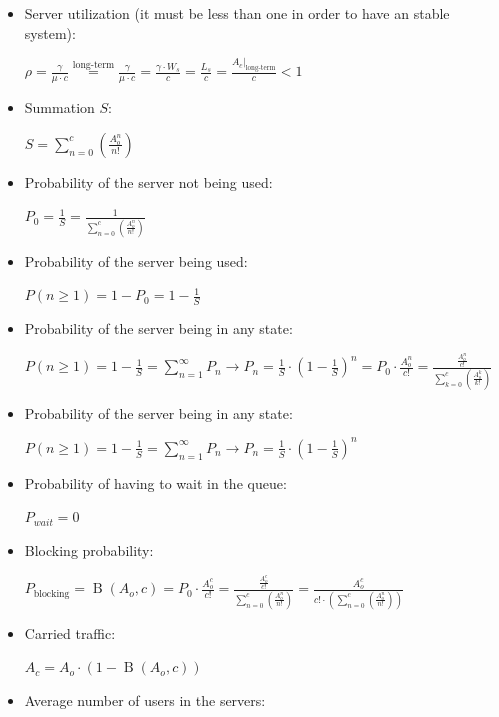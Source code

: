 \documentclass[../main.tex]{subfiles}
\begin{document}
\begin{itemize}
	\item {
		Server utilization (it must be less than one in order to have an stable system):

		$
			\rho =
			\frac {\gamma} {\mu \cdot c} \overset {\textrm{long-term}} {=}
			\frac {\gamma} {\mu \cdot c} =
			\frac {\gamma \cdot W_s} {c} =
			\frac {L_s} {c} =
			\frac {\left. A_c \right|_{\textrm{long-term}}} {c}
			< 1
		$
	}
	\item {
		Summation $S$:

		$
			S = \sum_{n=0}^{c} \left( \frac {A_{o}^n} {n!} \right)
		$
	}
	\item {
		Probability of the server not being used:

		$
			P_0 = \frac {1} {S} = \frac {1} {\sum_{n=0}^{c} \left( \frac {A_{o}^n} {n!} \right)}
		$
	}
	\item {
		Probability of the server being used:

		$
			P(n \geq 1) = 1 - P_0 = 1 - \frac {1} {S}
		$
	}
	\item {
		Probability of the server being in any state:

		$
			P(n \geq 1) = 1 - \frac {1} {S} = \sum_{n=1}^{\infty} P_n \rightarrow
			P_n = \frac {1} {S} \cdot \left( 1 - \frac {1} {S} \right)^n =
			P_0 \cdot \frac {A_{o}^n} {c!} = \frac {\frac{A_{o}^n}{c!}} {\sum_{k=0}^c \left( \frac {A_{o}^k} {k!} \right)}
		$
	}
	\item {
		Probability of the server being in any state:

		$
			P(n \geq 1) = 1 - \frac {1} {S} = \sum_{n=1}^{\infty} P_n \rightarrow
			P_n = \frac {1} {S} \cdot \left( 1 - \frac {1} {S} \right)^n
		$
	}
	\item {
		Probability of having to wait in the queue:

		$
			P_{wait} = 0
		$
	}
	\item {
		Blocking probability:

		$
			P_{\textrm{blocking}} = \operatorname{B}(A_o, c) = P_0 \cdot \frac {A_{o}^c} {c!} = \frac {\frac{A_{o}^c}{c!}} {\sum_{n=0}^c \left( \frac {A_{o}^n} {n!} \right)} = \frac {A_{o}^c} { c! \cdot \left( \sum_{n=0}^{c} \left( \frac {A_{o}^n} {n!} \right) \right) }
		$
	}
	\item {
		Carried traffic:

		$
			A_c = A_o \cdot \left( 1 - \operatorname{B}(A_o, c) \right)
		$
	}
	\item {
		Average number of users in the servers:

}
\end{itemize}
\end{document}
